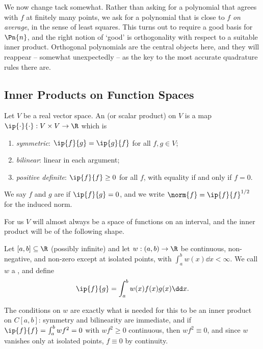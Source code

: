 We now change tack somewhat. Rather than asking for a polynomial that agrees with $f$ at finitely many points, we ask for a polynomial that is close to $f$ \emph{on average}, in the sense of least squares. This turns out to require a good basis for $\Pn{n}$, and the right notion of `good' is orthogonality with respect to a suitable inner product. Orthogonal polynomials are the central objects here, and they will reappear -- somewhat unexpectedly -- as the key to the most accurate quadrature rules there are.

\subsection{Inner Products on Function Spaces}

\begin{definition}
  Let $V$ be a real vector space. An  (or scalar product) on $V$ is a map $\ip{\cdot}{\cdot}: V \times V \to \R$ which is
  \begin{enumerate}[label=(\roman*)]
    \item \emph{symmetric}: $\ip{f}{g} = \ip{g}{f}$ for all $f, g \in V$;
    \item \emph{bilinear}: linear in each argument;
    \item \emph{positive definite}: $\ip{f}{f} \geq 0$ for all $f$, with equality if and only if $f = 0$.
  \end{enumerate}
  We say $f$ and $g$ are  if $\ip{f}{g} = 0$, and we write $\norm{f} = \ip{f}{f}^{1/2}$ for the induced norm.
\end{definition}

For us $V$ will almost always be a space of functions on an interval, and the inner product will be of the following shape.

\begin{definition}
  Let $[a,b] \subseteq \R$ (possibly infinite) and let $w : (a,b) \to \R$ be continuous, non-negative, and non-zero except at isolated points, with $\int_a^b w(x)\dd x < \infty$. We call $w$ a , and define
  $$
  \ip{f}{g} = \int_a^b w(x)f(x)g(x)\dd x.
  $$
\end{definition}

The conditions on $w$ are exactly what is needed for this to be an inner product on $C[a,b]$: symmetry and bilinearity are immediate, and if $\ip{f}{f} = \int_a^b w f^2 = 0$ with $wf^2 \geq 0$ continuous, then $wf^2 \equiv 0$, and since $w$ vanishes only at isolated points, $f \equiv 0$ by continuity.

